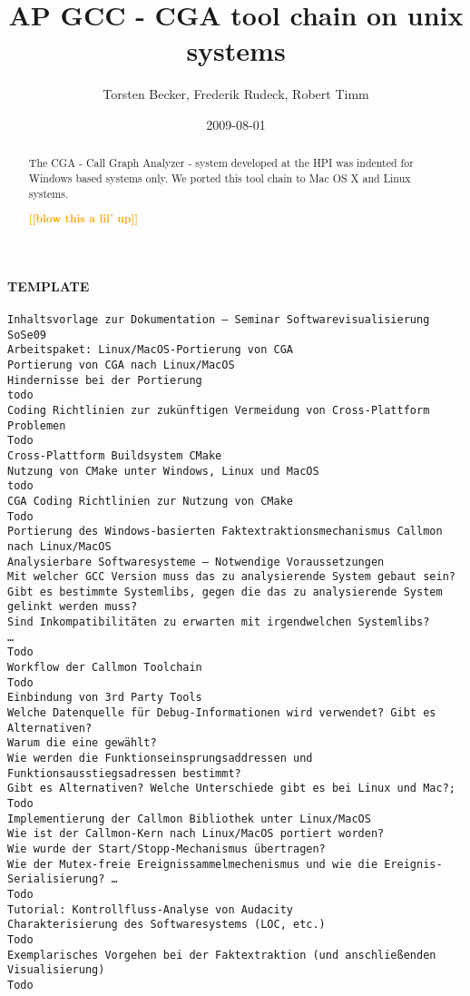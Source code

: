 \documentclass[]{article}
\title{AP GCC - CGA tool chain on unix systems}
\author{ Torsten Becker, Frederik Rudeck, Robert Timm }
\date{2009-08-01}
\newcommand{\todo}[1]{\textsf{\textbf{\textcolor{Orange}{[[#1]]}}}}
\begin{document}
\lstset{language=C++}

\ifpdf {} \else {} \fi

\maketitle
\begin{abstract}
	The CGA - Call Graph Analyzer - system developed at the HPI was indented for Windows based systems only. We ported this tool chain to Mac OS X and Linux systems.
	
	\todo{blow this a lil' up}
\end{abstract}


\paragraph{TEMPLATE}
\begin{verbatim}
Inhaltsvorlage zur Dokumentation – Seminar Softwarevisualisierung SoSe09
Arbeitspaket: Linux/MacOS-Portierung von CGA
Portierung von CGA nach Linux/MacOS
Hindernisse bei der Portierung
todo
Coding Richtlinien zur zukünftigen Vermeidung von Cross-Plattform Problemen
Todo
Cross-Plattform Buildsystem CMake
Nutzung von CMake unter Windows, Linux und MacOS
todo
CGA Coding Richtlinien zur Nutzung von CMake
Todo
Portierung des Windows-basierten Faktextraktionsmechanismus Callmon nach Linux/MacOS
Analysierbare Softwaresysteme – Notwendige Voraussetzungen
Mit welcher GCC Version muss das zu analysierende System gebaut sein?
Gibt es bestimmte Systemlibs, gegen die das zu analysierende System gelinkt werden muss?
Sind Inkompatibilitäten zu erwarten mit irgendwelchen Systemlibs?
…
Todo
Workflow der Callmon Toolchain
Todo
Einbindung von 3rd Party Tools 
Welche Datenquelle für Debug-Informationen wird verwendet? Gibt es Alternativen? 
Warum die eine gewählt?
Wie werden die Funktionseinsprungsaddressen und Funktionsausstiegsadressen bestimmt? 
Gibt es Alternativen? Welche Unterschiede gibt es bei Linux und Mac?; Todo
Implementierung der Callmon Bibliothek unter Linux/MacOS
Wie ist der Callmon-Kern nach Linux/MacOS portiert worden? 
Wie wurde der Start/Stopp-Mechanismus übertragen? 
Wie der Mutex-freie Ereignissammelmechenismus und wie die Ereignis-Serialisierung? …
Todo
Tutorial: Kontrollfluss-Analyse von Audacity
Charakterisierung des Softwaresystems (LOC, etc.)
Todo
Exemplarisches Vorgehen bei der Faktextraktion (und anschließenden Visualisierung)
Todo
\end{verbatim}
\end{document}
